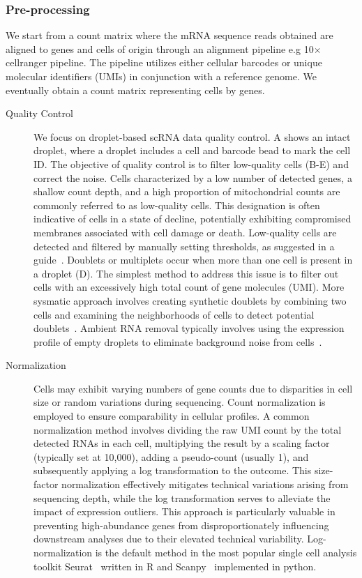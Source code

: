 \subsubsection{Pre-processing}
We start from a count matrix where the mRNA sequence reads obtained are aligned to genes and cells of origin through an alignment pipeline e.g 10$\times$ cellranger pipeline\citep{zheng2017massively}. The pipeline utilizes either cellular barcodes or unique molecular identifiers (UMIs) in conjunction with a reference genome. We eventually obtain a count matrix representing cells by genes.
\begin{description}
	\item[Quality Control]
	We focus on droplet-based scRNA data quality control. A shows an intact droplet, where a droplet includes a cell and barcode bead to mark the cell ID. The objective of quality control is to filter low-quality cells (B-E) and correct the noise. Cells characterized by a low number of detected genes, a shallow count depth, and a high proportion of mitochondrial counts are commonly referred to as low-quality cells. This designation is often indicative of cells in a state of decline, potentially exhibiting compromised membranes associated with cell damage or death. Low-quality cells are detected and filtered by manually setting thresholds, as suggested in a guide~\citep{luecken2019current}. Doublets or multiplets occur when more than one cell is present in a droplet (D). The simplest method to address this issue is to filter out cells with an excessively high total count of gene molecules (UMI). More sysmatic approach involves creating synthetic doublets by combining two cells and examining the neighborhoods of cells to detect potential doublets~\citep{mcginnis2019doubletfinder}. Ambient RNA removal typically involves using the expression profile of empty droplets to eliminate background noise from cells~\citep{janssen2023benchambient}.


	\item[Normalization]
	Cells may exhibit varying numbers of gene counts due to disparities in cell size or random variations during sequencing. Count normalization is employed to ensure comparability in cellular profiles. A common normalization method involves dividing the raw UMI count by the total detected RNAs in each cell, multiplying the result by a scaling factor (typically set at 10,000), adding a pseudo-count (usually 1), and subsequently applying a log transformation to the outcome. This size-factor normalization effectively mitigates technical variations arising from sequencing depth, while the log transformation serves to alleviate the impact of expression outliers. This approach is particularly valuable in preventing high-abundance genes from disproportionately influencing downstream analyses due to their elevated technical variability. Log-normalization is the default method in the most popular single cell analysis toolkit Seurat~\citep{stuart2019seurat3} written in R and Scanpy~\citep{wolf2018scanpy} implemented in python.


\end{description}
